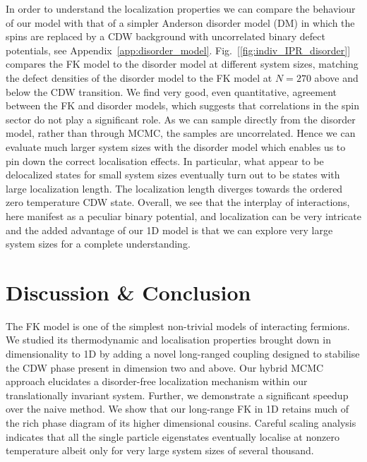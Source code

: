 In order to understand the localization properties we can compare the behaviour of our model with that of a simpler Anderson disorder model (DM) in which the spins are replaced by a \ac{CDW} background with uncorrelated binary defect potentials, see Appendix~\ref{app:disorder_model}. Fig.~[\ref{fig:indiv_IPR_disorder}] compares the FK model to the disorder model at different system sizes, matching the defect densities of the disorder model to the FK model at \(N = 270\) above and below the CDW transition. We find very good, even quantitative, agreement between the FK and disorder models, which suggests that correlations in the spin sector do not play a significant role. As we can sample directly from the disorder model, rather than through MCMC, the samples are uncorrelated. Hence we can evaluate much larger system sizes with the disorder model which enables us to pin down the correct localisation effects. In particular, what appear to be delocalized states for small system sizes eventually turn out to be states with large localization length. The localization length diverges towards the ordered zero temperature CDW state. Overall, we see that the interplay of interactions, here manifest as a peculiar binary potential, and localization can be very intricate and the added advantage of our 1D model is that we can explore very large system sizes for a complete understanding.  

\section{Discussion \& Conclusion}
The \ac{FK} model is one of the simplest non-trivial models of interacting fermions. We studied its thermodynamic and localisation properties brought down in dimensionality to 1D by adding a novel long-ranged coupling designed to stabilise the \ac{CDW} phase present in dimension two and above. Our hybrid \ac{MCMC} approach elucidates a disorder-free localization mechanism within our translationally invariant system. Further, we demonstrate a significant speedup over the naive method. We show that our long-range \ac{FK} in 1D retains much of the rich phase diagram of its higher dimensional cousins. Careful scaling analysis indicates that all the single particle eigenstates eventually localise at nonzero temperature albeit only for very large system sizes of several thousand.

